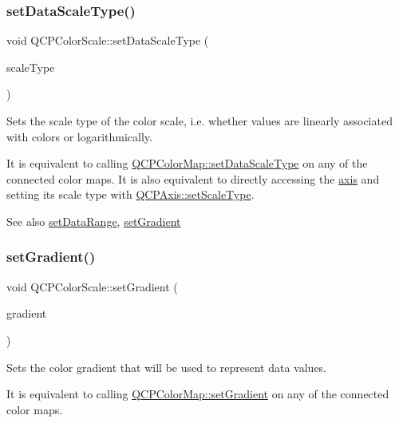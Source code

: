 \subsubsection{\texorpdfstring{set\+Data\+Scale\+Type()}{setDataScaleType()}}
{\footnotesize\ttfamily void Q\+C\+P\+Color\+Scale\+::set\+Data\+Scale\+Type (\begin{DoxyParamCaption}\item[{\hyperlink{class_q_c_p_axis_a36d8e8658dbaa179bf2aeb973db2d6f0}{Q\+C\+P\+Axis\+::\+Scale\+Type}}]{scale\+Type }\end{DoxyParamCaption})}

Sets the scale type of the color scale, i.\+e. whether values are linearly associated with colors or logarithmically.

It is equivalent to calling \hyperlink{class_q_c_p_color_map_a9d20aa08e3c1f20f22908c45b9c06511}{Q\+C\+P\+Color\+Map\+::set\+Data\+Scale\+Type} on any of the connected color maps. It is also equivalent to directly accessing the \hyperlink{class_q_c_p_color_scale_a39bdbdb3b212602a5a57f9f3ea444190}{axis} and setting its scale type with \hyperlink{class_q_c_p_axis_adef29cae617af4f519f6c40d1a866ca6}{Q\+C\+P\+Axis\+::set\+Scale\+Type}.

\begin{DoxySeeAlso}{See also}
\hyperlink{class_q_c_p_color_scale_abe88633003a26d1e756aa74984587fef}{set\+Data\+Range}, \hyperlink{class_q_c_p_color_scale_a1f29583bb6f1e7f473b62fb712be3940}{set\+Gradient} 
\end{DoxySeeAlso}
\mbox{\label{class_q_c_p_color_scale_a1f29583bb6f1e7f473b62fb712be3940}} 
\subsubsection{\texorpdfstring{set\+Gradient()}{setGradient()}}
{\footnotesize\ttfamily void Q\+C\+P\+Color\+Scale\+::set\+Gradient (\begin{DoxyParamCaption}\item[{const \hyperlink{class_q_c_p_color_gradient}{Q\+C\+P\+Color\+Gradient} \&}]{gradient }\end{DoxyParamCaption})}

Sets the color gradient that will be used to represent data values.

It is equivalent to calling \hyperlink{class_q_c_p_color_map_a7313c78360471cead3576341a2c50377}{Q\+C\+P\+Color\+Map\+::set\+Gradient} on any of the connected color maps.

